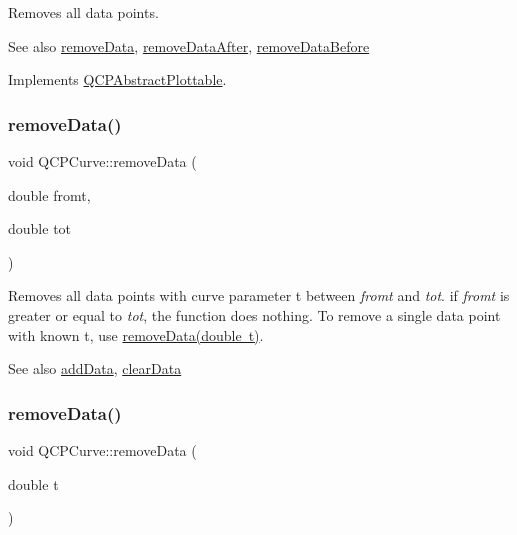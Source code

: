 Removes all data points. \begin{DoxySeeAlso}{See also}
\mbox{\hyperlink{class_q_c_p_curve_ad45bb5479be799163028ef2b776f7221}{remove\+Data}}, \mbox{\hyperlink{class_q_c_p_curve_a0365cb947c4e6d405ee22e00191d5f52}{remove\+Data\+After}}, \mbox{\hyperlink{class_q_c_p_curve_af6f4284fbc2f34e676f24dce03c34fe5}{remove\+Data\+Before}} 
\end{DoxySeeAlso}


Implements \mbox{\hyperlink{class_q_c_p_abstract_plottable_a86e5b8fd4b6ff4f4084e7ea4c573fc53}{Q\+C\+P\+Abstract\+Plottable}}.

\mbox{\label{class_q_c_p_curve_ad45bb5479be799163028ef2b776f7221}} 
\subsubsection{\texorpdfstring{remove\+Data()}{removeData()}\hspace{0.1cm}{\footnotesize\ttfamily [1/2]}}
{\footnotesize\ttfamily void Q\+C\+P\+Curve\+::remove\+Data (\begin{DoxyParamCaption}\item[{double}]{fromt,  }\item[{double}]{tot }\end{DoxyParamCaption})}

Removes all data points with curve parameter t between {\itshape fromt} and {\itshape tot}. if {\itshape fromt} is greater or equal to {\itshape tot}, the function does nothing. To remove a single data point with known t, use \mbox{\hyperlink{class_q_c_p_curve_a30c91acfa591ec534c49fed4c0fca39a}{remove\+Data(double t)}}.

\begin{DoxySeeAlso}{See also}
\mbox{\hyperlink{class_q_c_p_curve_a4e24023c3b9ac75440c7a260172c99af}{add\+Data}}, \mbox{\hyperlink{class_q_c_p_curve_ae0462c61dbfbac07db0736ec64110241}{clear\+Data}} 
\end{DoxySeeAlso}
\mbox{\label{class_q_c_p_curve_a30c91acfa591ec534c49fed4c0fca39a}} 
\subsubsection{\texorpdfstring{remove\+Data()}{removeData()}\hspace{0.1cm}{\footnotesize\ttfamily [2/2]}}
{\footnotesize\ttfamily void Q\+C\+P\+Curve\+::remove\+Data (\begin{DoxyParamCaption}\item[{double}]{t }\end{DoxyParamCaption})}

